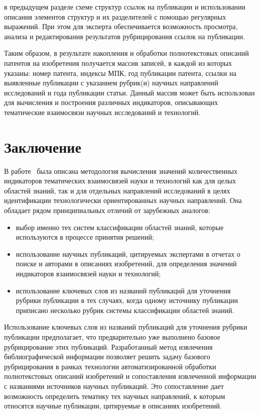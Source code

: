 \begin{multicols}{2}

\noindent
 в предыдущем разделе схеме структур ссылок на публикации и использовании 
описания элементов структур и их разделителей с помощью регулярных выражений. При этом 
для эксперта обеспечивается возможность просмотра, анализа и редактирования результатов 
рубрицирования ссылок на публикации.
      
      Таким образом, в результате накопления и обработки полнотекстовых описаний 
патентов на изобретения получается массив записей, в каждой из которых указаны: номер 
патента, индексы МПК, год публикации патента, ссылки на выявленные публикации с 
указанием рубрик(и) научных на\-прав\-ле\-ний исследований и года публикации \mbox{статьи}. Данный 
массив может быть использован для вычисления и построения различных индикаторов, 
описывающих тематические взаимосвязи научных исследований и технологий.

\section{Заключение}
      
  В работе~\cite{14-zac} была описана методология вычисления значений количественных 
индикаторов тематических взаимосвязей науки и технологий как для целых областей знаний, 
так и для отдельных направлений исследований в целях идентификации технологически 
ориентированных научных направлений. Она обладает рядом принципиальных отличий от 
зарубежных аналогов:
  \begin{itemize}
\item выбор именно тех систем классификации областей знаний, которые используются в 
процессе принятия решений;
\item использование научных публикаций, ци\-ти\-ру\-емых экспертами в отчетах о поиске и 
авторами в описаниях изобретений, для определения значений индикаторов взаимосвязей 
науки и технологий;
\item использование ключевых слов из названий пуб\-ли\-ка\-ций для уточнения рубрики 
публикации в тех случаях, когда одному источнику пуб\-ли\-ка\-ции приписано несколько 
рубрик системы классификации областей знаний.
  \end{itemize}
  
  Использование ключевых слов из названий публикаций для уточнения рубрики публикации 
предполагает, что предварительно уже выполнено базовое рубрицирование этих публикаций. 
Разработанный метод извлечения библиографической информации позволяет решить задачу 
базового руб\-ри\-ци\-ро\-ва\-ния в рамках технологии автоматизированной обработки полнотекстовых 
описаний изобретений и сопоставления извлеченной информации с названиями источников 
научных публикаций. Это сопоставление дает возможность определить тематику тех научных 
направлений, к которым относятся научные публикации, цитируемые в описаниях изобретений.
  

\end{multicols}
